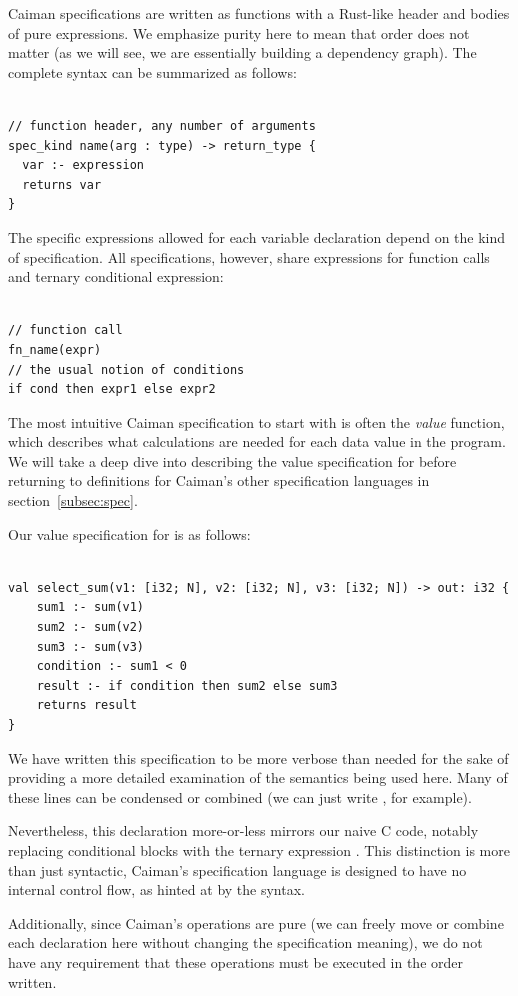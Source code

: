 Caiman specifications are written as functions with a Rust-like header and bodies of pure expressions.  We emphasize purity here to mean that order does not matter (as we will see, we are essentially building a dependency graph).  The complete syntax can be summarized as follows:
%
\begin{lstlisting}

// function header, any number of arguments
spec_kind name(arg : type) -> return_type {
  var :- expression
  returns var
}
\end{lstlisting}
%
The specific expressions allowed for each variable declaration depend on the kind of specification.  All specifications, however, share expressions for function calls and ternary conditional expression:
%
\begin{lstlisting}

// function call
fn_name(expr)
// the usual notion of conditions
if cond then expr1 else expr2
\end{lstlisting}
%
The most intuitive Caiman specification to start with is often the \textit{value} function, which describes what calculations are needed for each data value in the program.  We will take a deep dive into describing the value specification for  before returning to definitions for Caiman's other specification languages in section~\ref{subsec:spec}.  

Our value specification for  is as follows:
%
\begin{lstlisting}

val select_sum(v1: [i32; N], v2: [i32; N], v3: [i32; N]) -> out: i32 {
    sum1 :- sum(v1)
    sum2 :- sum(v2)
    sum3 :- sum(v3)
    condition :- sum1 < 0
    result :- if condition then sum2 else sum3
    returns result
}
\end{lstlisting}
%
We have written this specification to be more verbose than needed for the sake of providing a more detailed examination of the semantics being used here.  Many of these lines can be condensed or combined (we can just write , for example).

Nevertheless, this declaration more-or-less mirrors our naive C code, notably replacing conditional  blocks with the ternary expression .  This distinction is more than just syntactic, Caiman's specification language is designed to have no internal control flow, as hinted at by the syntax.

Additionally, since Caiman's operations are pure (we can freely move or combine each declaration here without changing the specification meaning), we do not have any requirement that these operations must be executed in the order written.

